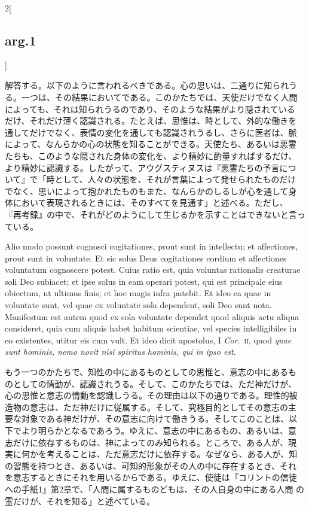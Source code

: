 \documentclass[paper=a4paper,fontsize=10pt,jafontsize=9pt,titlepage]{jlreq}
\begin{document}
\begin{paracol}{2}[\subsection{arg.1}]
\switchcolumn

解答する。以下のように言われるべきである。心の思いは、二通りに知られう
る。一つは、その結果においてである。このかたちでは、天使だけでなく人間
によっても、それは知られうるのであり、そのような結果がより隠されている
だけ、それだけ薄く認識される。たとえば、思惟は、時として、外的な働きを
通してだけでなく、表情の変化を通しても認識されうるし、さらに医者は、脈
によって、なんらかの心の状態を知ることができる。天使たち、あるいは悪霊
たちも、このような隠された身体の変化を、より精妙に酌量すればするだけ、
より精妙に認識する。したがって、アウグスティヌスは『悪霊たちの予言につ
いて』で「時として、人々の状態を、それが言葉によって発せられたものだけ
でなく、思いによって抱かれたものもまた、なんらかのしるしが心を通して身
体において表現されるときには、そのすべてを見通す」と述べる。ただし、
『再考録』の中で、それがどのようにして生じるかを示すことはできないと言っ
ている。

\switchcolumn*

Alio modo possunt cognosci cogitationes, prout sunt in intellectu; et
affectiones, prout sunt in voluntate. Et sic solus Deus cogitationes
cordium et affectiones voluntatum cognoscere potest. Cuius ratio est,
quia voluntas rationalis creaturae soli Deo subiacet; et ipse solus in
eam operari potest, qui est principale eius obiectum, ut ultimus
finis; et hoc magis infra patebit. Et ideo ea quae in voluntate sunt,
vel quae ex voluntate sola dependent, soli Deo sunt nota. Manifestum
est autem quod ex sola voluntate dependet quod aliquis actu aliqua
consideret, quia cum aliquis habet habitum scientiae, vel species
intelligibiles in eo existentes, utitur eis cum vult. Et ideo dicit
apostolus, I {\itshape Cor}.~{\scshape ii}, quod {\itshape quae sunt
hominis, nemo novit nisi spiritus hominis, qui in ipso est}.

\switchcolumn

もう一つのかたちで、知性の中にあるものとしての思惟と、意志の中にあるも
のとしての情動が、認識されうる。そして、このかたちでは、ただ神だけが、
心の思惟と意志の情動を認識しうる。その理由は以下の通りである。理性的被
造物の意志は、ただ神だけに従属する。そして、究極目的としてその意志の主
要な対象である神だけが、その意志に向けて働きうる。そしてこのことは、以
下でより明らかとなるであろう。ゆえに、意志の中にあるもの、あるいは、意
志だけに依存するものは、神によってのみ知られる。ところで、ある人が、現
実に何かを考えることは、ただ意志だけに依存する。なぜなら、ある人が、知
の習態を持つとき、あるいは、可知的形象がその人の中に存在するとき、それ
を意志するときにそれを用いるからである。ゆえに、使徒は『コリントの信徒
への手紙1』第2章で、「人間に属するものどもは、その人自身の中にある人間
の霊だけが、それを知る」と述べている。


\end{paracol}
\end{document}
